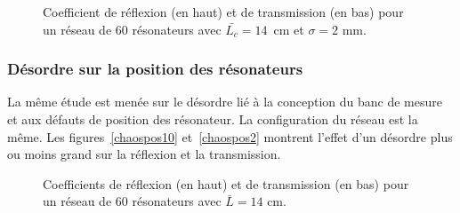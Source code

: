\begin{figure}[!h]
\begin{minipage}{0.45 \textwidth}
		\caption{\label{chaos2} Coefficient de réflexion (en haut) et de transmission (en bas) pour un réseau de 60 résonateurs avec $\bar{L_c}=14$~cm et $\sigma=2$ mm.}
	\end{minipage}
\end{figure}



\subsubsection{Désordre sur la position des résonateurs}
La même étude est menée sur le désordre lié à la conception du banc de mesure et aux défauts de position des résonateur. La configuration du réseau est la même.
Les figures~\ref{chaospos10} et~\ref{chaospos2} montrent l'effet d'un désordre plus ou moins grand sur la réflexion et la transmission.

\begin{figure}[h!]
	\caption{Coefficients de réflexion (en haut) et de transmission (en bas) pour un réseau de 60 résonateurs avec $\bar{L}=14$ cm.}
\end{figure}

